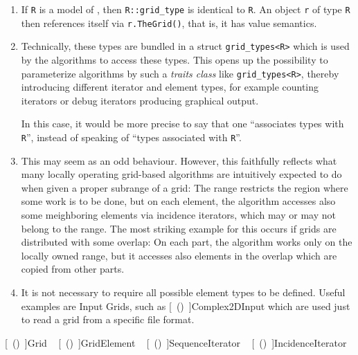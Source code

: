     \begin{enumerate}
    \item       {}
      If {\tt  R} is a model of
      ,
      then {\tt  R::grid\_type} is identical to {\tt  R}.
      An object {\tt  r} of type {\tt R} 
      then references itself via {\tt  r.TheGrid()}, 
      that is, it has value semantics.
          
      \item   {}
        Technically, these types are bundled in a struct {\tt  grid\_types<R>}
      which is used by the algorithms to access these types. This opens up the possibility
      to parameterize algorithms by such a {\em  traits class} like {\tt  grid\_types<R>},
      thereby introducing different iterator and element types, for example counting iterators
      or debug iterators producing graphical output.
    
      In this case, it would be more precise to say that one 
      ``associates types with {\tt  R}'', 
      instead of speaking of ``types associated with {\tt  R}''.

      
      \item {}
        This may seem as an odd behaviour. However, this faithfully reflects what many
      locally operating grid-based algorithms are intuitively expected to do when
      given a proper subrange of a grid: The range restricts the region where some
      work is to be done, but on each element, the algorithm accesses also some
      meighboring elements via incidence iterators, which may or may not belong to the
      range. The most striking example for this occurs if grids are distributed with
      some overlap: On each part, the algorithm works only on the locally owned range, 
      but it accesses also elements in the overlap which are copied from other parts.

     
      \item 
        It is not necessary to require all possible element types to be defined.
      Useful examples are Input Grids, 
      such as [~(\Ref )~]{Complex2DInput}
      which are used just to read a grid from
      a specific file format.
    \end{enumerate}

    [~(\Ref )~]{Grid} ~
    [~(\Ref )~]{GridElement} ~
    [~(\Ref )~]{SequenceIterator} ~
    [~(\Ref )~]{IncidenceIterator} 


